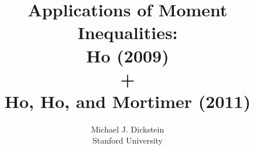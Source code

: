 %
%
%
%


\def\beamerclassoptions{[notes=show]}

\usepackage{mathpazo}
\usepackage{hyperref}


\usepackage{graphicx}
\usepackage[latin1]{inputenc}
\usepackage{listings}
\usepackage{amsmath}
\usepackage{amsfonts}
\usepackage{amsxtra}
\usepackage{amstext}
\usepackage{amssymb}
\usepackage{latexsym}
\usepackage{subfigure}
\usepackage{eurosym}
\linespread{1.2}
\usepackage{multimedia}
\usepackage{dsfont} %
\usepackage{graphicx}
\usepackage{color,colortbl}
\usepackage{multirow}
\usepackage{bbm}


\newenvironment{stepenumerate}{\begin{enumerate}[<+->]}{\end{enumerate}}
\newenvironment{stepitemize}{\begin{itemize}[<+->]}{\end{itemize} }
\newenvironment{stepenumeratewithalert}{\begin{enumerate}[<+-| alert@+>]}{\end{enumerate}}
\newenvironment{stepitemizewithalert}{\begin{itemize}[<+-| alert@+>]}{\end{itemize} }

%



\title[Moment Inequalities]{Applications of Moment Inequalities:\\ Ho (2009) \\ + \\ Ho, Ho, and Mortimer (2011)}
\author[MJ Dickstein]{Michael J. Dickstein \\
Stanford University}
\maketitle

